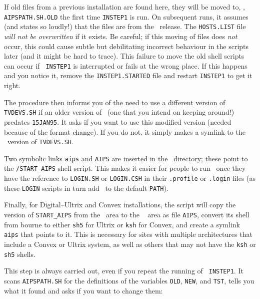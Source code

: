 If old files from a previous installation are found here, they will be
moved to, \eg, {\tt AIPSPATH.SH.OLD} the first time {\tt INSTEP1} is
run.  On subsequent runs, it assumes (and states so loudly!)  that the
files are from the \THISVER\ release.  The {\tt HOSTS.LIST} file {\it
will not be overwritten\/} if it exists.  Be careful; if this moving of
files does {\it not\/} occur, this could cause subtle but debilitating
incorrect behaviour in the scripts later (and it might be hard to
trace).  This failure to move the old shell scripts can occur if {\tt
INSTEP1} is interrupted or fails at the wrong place.  If this happens
and you notice it, remove the {\tt INSTEP1.STARTED} file and restart
{\tt INSTEP1} to get it right.

The procedure then informs you of the need to use a different version of
{\tt TVDEVS.SH} if an older version of \AIPS\ (one that you intend on
keeping around!) predates {\tt 15JAN95}.  It asks if you want to use
this modified version (needed because of the format change).  If you do
not, it simply makes a symlink to the \SYSU\ version of {\tt TVDEVS.SH}.

Two symbolic links {\tt aips} and {\tt AIPS} are inserted in the \SYSL\
directory; these point to the {\tt \AROOT/START\_AIPS} shell script.
This makes it easier for people to run \ttaips\ once they have the
reference to {\tt LOGIN.SH} or {\tt LOGIN.CSH} in their {\tt .profile}
or {\tt .login} files (as these {\tt LOGIN} scripts in turn add \SYSL\
to the default {\tt PATH}).

Finally, for Digital--Ultrix and Convex installations, the script will
copy the version of {\tt START\_AIPS} from the \AROOT\ area to the
\SYSL~ area as file {\tt AIPS}, convert its shell from bourne to either
{\tt sh5} for Ultrix or {\tt ksh} for Convex, and create a symlink {\tt
aips} that points to it.  This is necessary for sites with multiple
architectures that include a Convex or Ultrix system, as well as others
that may not have the {\tt ksh} or {\tt sh5} shells.

\medskip{}

This step is always carried out, even if you repeat the running of {\tt
INSTEP1}.  It scans {\tt AIPSPATH.SH} for the definitions of the
variables {\tt OLD}, {\tt NEW}, and {\tt TST}, tells you what it found
and asks if you want to change them:\medskip

\example{}
\example{INSTEP1: \ \ \ \ TST \ \ \AROOT/\THISVER}
\example{}
\medskip

